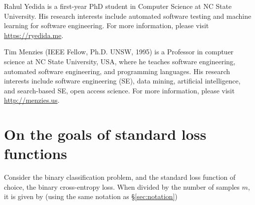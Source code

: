 \documentclass[10pt,compsoc,twocolumn]{IEEEtran}
\newcommand{\respto}[1]{
\fcolorbox{black}{black!15}{%
\label{resp:#1}%
\bf\scriptsize R{#1}}}
\begin{document}
\balance

 

\begin{minipage}{.5\textwidth}
\begin{IEEEbiography}{Rahul Yedida} is a first-year PhD student in Computer Science at NC State University. His research interests include automated software testing and machine learning for software engineering. For more information, please visit \url{https://ryedida.me}.
\end{IEEEbiography}
 

\begin{IEEEbiography}{Tim Menzies} (IEEE Fellow, Ph.D. UNSW, 1995)
is a Professor in comptuer science  at NC State University, USA,  
where he teaches software engineering,
automated software engineering,
and programming languages.
His research interests include software engineering (SE), data mining, artificial intelligence, and search-based SE, open access science. 
For more information,  please visit \url{http://menzies.us}.
\end{IEEEbiography}
\end{minipage}

\onecolumn
\appendices 

\section{On the goals of standard loss functions \respto{3a2.2}}
\label{sec:appendix}

Consider the binary classification problem, and the standard loss function of choice, the binary cross-entropy loss. When divided by the number of samples $m$, it is given by (using the same notation as \S \ref{sec:notation})
\end{document}
